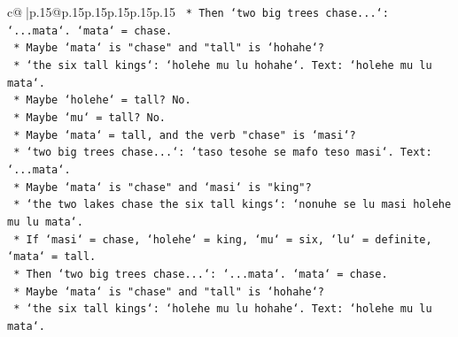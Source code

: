 \documentclass{article}
\begin{document}
{\begin{supertabular}{c@{$\;$}|p{.15\linewidth}@{}p{.15\linewidth}p{.15\linewidth}p{.15\linewidth}p{.15\linewidth}p{.15\linewidth}}
{{{\texttt{                                                                                    *   Then `two big trees chase...`: `...mata`. `mata` = chase.} \\
\texttt{                                                                                    *   Maybe `mata` is "chase" and "tall" is `hohahe`?} \\
\texttt{                                                                                        *   `the six tall kings`: `holehe mu lu hohahe`. Text: `holehe mu lu mata`.} \\
\texttt{                                                                                        *   Maybe `holehe` = tall? No.} \\
\texttt{                                                                                        *   Maybe `mu` = tall? No.} \\
\texttt{                                                                                        *   Maybe `mata` = tall, and the verb "chase" is `masi`?} \\
\texttt{                                                                                            *   `two big trees chase...`: `taso tesohe se mafo teso masi`. Text: `...mata`.} \\
\texttt{                                                                                            *   Maybe `mata` is "chase" and `masi` is "king"?} \\
\texttt{                                                                                                *   `the two lakes chase the six tall kings`: `nonuhe se lu masi holehe mu lu mata`.} \\
\texttt{                                                                                                *   If `masi` = chase, `holehe` = king, `mu` = six, `lu` = definite, `mata` = tall.} \\
\texttt{                                                                                                *   Then `two big trees chase...`: `...mata`. `mata` = chase.} \\
\texttt{                                                                                                *   Maybe `mata` is "chase" and "tall" is `hohahe`?} \\
\texttt{                                                                                                    *   `the six tall kings`: `holehe mu lu hohahe`. Text: `holehe mu lu mata`.} \\
}}}
\end{supertabular}}
\end{document}

